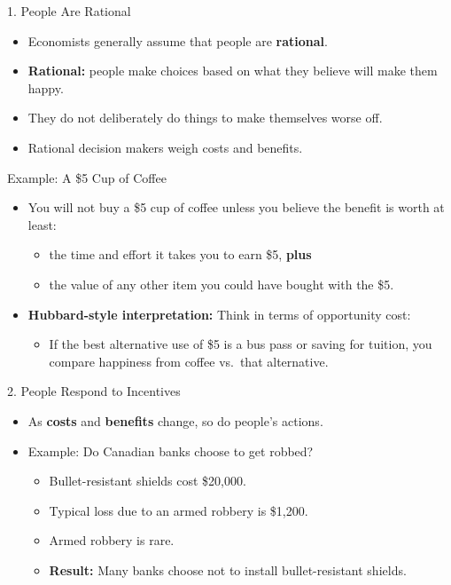 \documentclass[aspectratio=169]{beamer}
\begin{document}
\begin{frame}{1. People Are Rational}
\transfade
\begin{itemize}[<+->]
  \item Economists generally assume that people are \textbf{rational}.
  \item \textbf{Rational:} people make choices based on what they believe will make them happy.
  \item They do not deliberately do things to make themselves worse off.
  \item Rational decision makers weigh \alert{costs} and \alert{benefits}.
\end{itemize}
\end{frame}

\begin{frame}{Example: A \$5 Cup of Coffee}
\transfade
\begin{itemize}[<+->]
  \item You will not buy a \$5 cup of coffee unless you believe the benefit is worth at least:
  \begin{itemize}[<+->]
    \item the time and effort it takes you to earn \$5, \textbf{plus}
    \item the value of any other item you could have bought with the \$5.
  \end{itemize}
  \item \textbf{Hubbard-style interpretation:} Think in terms of \alert{opportunity cost}:
  \begin{itemize}[<+->]
    \item If the best alternative use of \$5 is a bus pass or saving for tuition, you compare happiness from coffee vs.\ that alternative.
  \end{itemize}
\end{itemize}
\end{frame}

\begin{frame}{2. People Respond to Incentives}
\transfade
\begin{itemize}[<+->]
  \item As \textbf{costs} and \textbf{benefits} change, so do people's actions.
  \item Example: Do Canadian banks choose to get robbed?
  \begin{itemize}[<+->]
    \item Bullet-resistant shields cost \$20{,}000.
    \item Typical loss due to an armed robbery is \$1{,}200.
    \item Armed robbery is rare.
    \item \textbf{Result:} Many banks choose not to install bullet-resistant shields.
  \end{itemize}
\end{itemize}
\end{frame}
\end{document}
